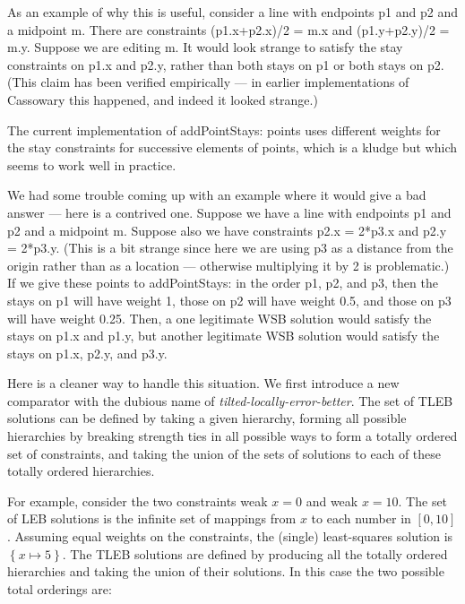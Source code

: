 \documentclass{article}
\newcommand{\strength}{\sf}
\begin{document}
As an example of why this is useful, consider a line with endpoints 
{\sf p1} and {\sf p2} and a midpoint {\sf m}.  There are constraints 
{\sf (p1.x+p2.x)/2 = m.x} and {\sf (p1.y+p2.y)/2 = m.y}.  Suppose we are
editing {\sf m}.  It would look strange to satisfy the stay constraints on
{\sf p1.x} and  {\sf p2.y}, rather than both stays on {\sf p1} or both
stays on {\sf p2}.  (This claim has been verified
empirically --- in earlier implementations of Cassowary this
happened, and indeed it looked strange.)

The current implementation of {\sf addPointStays: points} uses different
weights for the stay constraints for successive elements of {\sf points},
which is a kludge but which seems to work well in practice.

We had some trouble coming up with an example where it would give a bad
answer --- here is a contrived one.  Suppose we have a line with
endpoints {\sf p1} and {\sf p2} and a midpoint {\sf m}.  Suppose also we
have constraints {\sf p2.x = 2*p3.x} and {\sf p2.y = 2*p3.y}.  (This is a
bit strange since here we are using {\sf p3} as a distance from the origin
rather than as a location --- otherwise multiplying it by 2 is
problematic.)  If we give these points to {\sf addPointStays:} in the order
{\sf p1}, {\sf p2}, and {\sf p3}, then the stays on {\sf p1} will have
weight 1, those on {\sf p2} will have weight 0.5, and those on {\sf p3}
will have weight 0.25.  Then, a one legitimate WSB solution would satisfy
the stays on {\sf p1.x} and {\sf p1.y}, but another legitimate WSB solution
would satisfy the stays on {\sf p1.x}, {\sf p2.y}, and {\sf p3.y}.

Here is a cleaner way to handle this situation.  We first introduce a new
comparator with the dubious name of \emph{tilted-locally-error-better}.  The
set of TLEB solutions can be defined by taking a given hierarchy, forming
all possible hierarchies by breaking strength ties in all possible ways to
form a totally ordered set of constraints, and taking the union of the sets
of solutions to each of these totally ordered hierarchies.

For example, consider the two constraints {\strength weak} $x=0$ and
{\strength weak} $x=10$.  The set of LEB solutions is the infinite set
of mappings from $x$ to each number in $\left[ 0, 10 \right]$.  Assuming 
equal weights on the constraints, the (single)
least-squares solution is $\left\{ x \mapsto 5 \right\}$.  The TLEB 
solutions are defined by
producing all the totally ordered hierarchies and taking the union of their
solutions.  In this case the two possible total orderings are:
\end{document}
